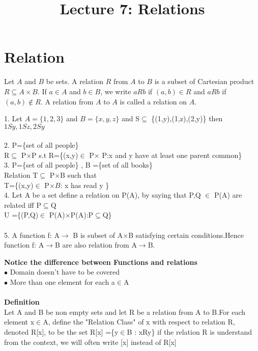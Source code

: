 \documentclass[a4paper,english,12pt]{article}
\title{Lecture 7: Relations}
\author{}
\begin{document}
\maketitle

\section{Relation}
Let $A$ and $B$ be sets. A relation $R$ from $A$ to $B$ is a subset of Cartesian product $R \subseteq A \times B $. If $a \in A$ and $b \in B$, we write $a R b$ if $(a,b) \in R$ and $a R b$ if $(a,b) \notin R$. 
A relation from $A$ to $A$ is called a relation on $A$.
\begin{exmp}
\begin{enumerate}
1. Let $A=\{1,2,3\}$ and $B =\{x,y,z\}$ and S$\subseteq$ \{(1,y),(1,z),(2,y)\} then $1Sy, 1Sz, 2Sy$\\\\
2. P=\{set of all people\}\\
R$\subseteq$ P$\times$P s.t R=\{(x,y)$\in$ P$\times$ P:x and y have at least one parent common\}\\
3. P=\{set of all people\} , B =\{set of all books\}\\
Relation T$\subseteq$ P$\times$B such that \\
T=\{(x,y)$\in$ P$\times B$: x has read y \}\\
4. Let A be a set define a relation on P(A), by saying that P,Q $\in$ P(A) are related iff P$\subseteq$Q\\
U =\{(P,Q)$\in$ P(A)$\times$P(A):P$\subseteq$Q\}\\\\
5. A function f: A$\rightarrow$ B is subset of A$\times$B satisfying certain conditions.Hence function f: A$\rightarrow$B are also relation from A$\rightarrow$B.
\end{enumerate}
\end{exmp}
\textbf{Notice the difference between Functions and relations}\\
$\bullet$ Domain doesn't have to be covered\\
$\bullet$ More than one element for each a$\in$A\\\\
\textbf{Definition}\\
Let A and B be non empty sets and let R be a relation from A to B.For each element x$\in$A, define the "Relation Class" of x with respect to relation R, denoted R[x], to be the set R[x] =\{y$\in$B : xRy\} if the relation R is understand from the context, we will often write [x] instead of R[x]\\
\end{document}
